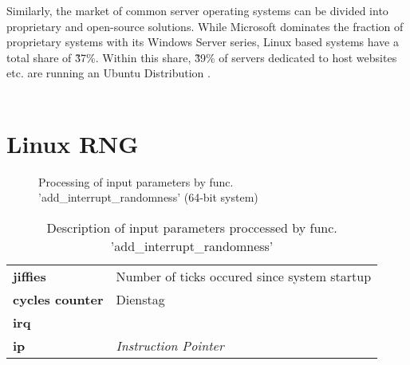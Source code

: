 Similarly, the market of common server operating systems can be divided into proprietary and open-source solutions. While Microsoft dominates the fraction of proprietary systems with its Windows Server series, Linux based systems have a total share of \~37\%. Within this share, \~39\% of servers dedicated to host websites etc. are running an Ubuntu Distribution \cite{statsharelinux} . \\~\\


\section{Linux RNG}
\begin{figure}[H]

\caption{Processing of input parameters by func. 'add\_interrupt\_randomness' (64-bit system)} \label{fig:add-int-rnd-chart}
\end{figure}


\begin{table}[H]
	\begin{tabular}{ll}
	\textbf{jiffies}&Number of ticks occured since system startup\\
	\textbf{cycles counter}&Dienstag\\
	\textbf{irq}&\\
	\textbf{ip}&\textit{Instruction Pointer}
	\end{tabular}
	\caption{Description of input parameters proccessed by func. 'add\_interrupt\_randomness'}	
\end{table}

		


